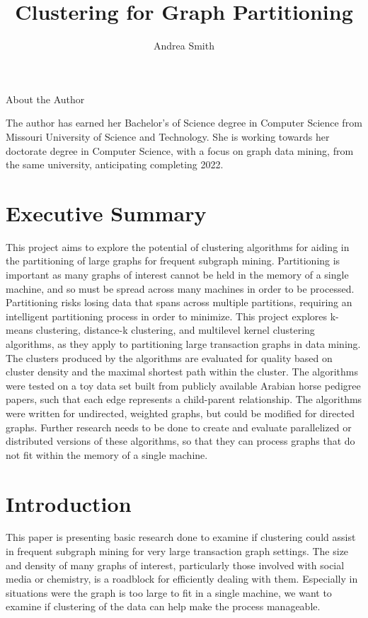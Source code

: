 \documentclass[12pt]{article}
\title{Clustering for Graph Partitioning}
\author{Andrea Smith}
\begin{document}
\begin{titlingpage}
\setlength{\droptitle}{30pt}
\maketitle
\begin{center}
{\selectfont
\large\centerline{About the Author}
}
The author has earned her Bachelor's of Science degree in Computer Science from Missouri University of Science and Technology. She is working towards her doctorate degree in Computer Science, with a focus on graph data mining, from the same university, anticipating completing 2022.
\end{center}
\end{titlingpage}

\tableofcontents

\newpage
\section{Executive Summary}
This project aims to explore the potential of clustering algorithms for aiding in the partitioning of large graphs for frequent subgraph mining. Partitioning is important as many graphs of interest cannot be held in the memory of a single machine, and so must be spread across many machines in order to be processed. Partitioning risks losing data that spans across multiple partitions, requiring an intelligent partitioning process in order to minimize. 
\newline\newline
This project explores k-means clustering, distance-k clustering, and multilevel kernel clustering algorithms, as they apply to partitioning large transaction graphs in data mining. The clusters produced by the algorithms are evaluated for quality based on cluster density and the maximal shortest path within the cluster. The algorithms were tested on a toy data set built from publicly available Arabian horse pedigree papers, such that each edge represents a child-parent relationship. The algorithms were written for undirected, weighted graphs, but could be modified for directed graphs.
\newline\newline
Further research needs to be done to create and evaluate parallelized or distributed versions of these algorithms, so that they can process graphs that do not fit within the memory of a single machine.

\newpage
\section{Introduction}
This paper is presenting basic research done to examine if clustering could assist in frequent subgraph mining for very large transaction graph settings. The size and density of many graphs of interest, particularly those involved with social media or chemistry, is a roadblock for efficiently dealing with them. Especially in situations were the graph is too large to fit in a single machine, we want to examine if clustering of the data can help make the process manageable.
\end{document}
